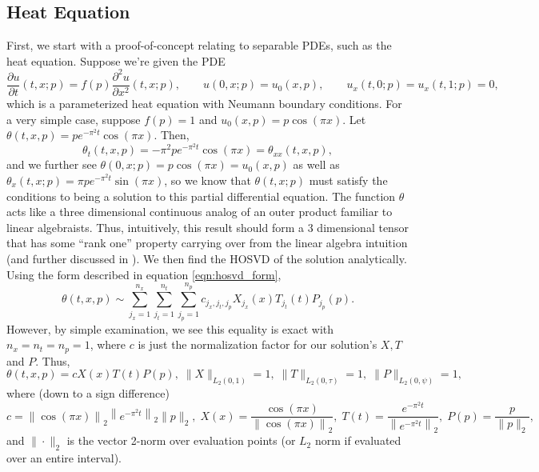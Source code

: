 \documentclass[12pt]{article}
\begin{document}
    \subsection{Heat Equation}
    First, we start with a proof-of-concept relating to separable PDEs, such as the heat equation. Suppose we're given the PDE
        \begin{equation}\label{eqn:pde}
            \frac{\partial u}{\partial t}(t,x;p) = f(p)\frac{\partial^2 u}{\partial x^2}(t,x;p),\qquad u(0,x;p) = u_0(x,p),\qquad u_x(t,0;p) = u_x(t,1;p) = 0,
        \end{equation}
    which is a parameterized heat equation with Neumann boundary conditions. For a very simple case, suppose $f(p) = 1$ and $u_0(x,p) = p\cos(\pi x)$. Let $\theta(t,x,p) = pe^{-\pi^2 t}\cos(\pi x)$. Then,
        \[\theta_t(t,x,p) = -\pi^2pe^{-\pi^2t}\cos(\pi x) =\theta_{xx}(t,x,p),\]
    and we further see $\theta(0,x;p) = p\cos(\pi x) = u_0(x,p)$ as well as $\theta_x(t,x;p) = \pi pe^{-\pi^2 t}\sin(\pi x)$, so we know that $\theta(t,x;p)$ must satisfy the conditions to being a solution to this partial differential equation. The function $\theta$ acts like a three dimensional continuous analog of an outer product familiar to linear algebraists. Thus, intuitively, this result should form a 3 dimensional tensor that has some ``rank one'' property carrying over from the linear algebra intuition (and further discussed in \cite{hosvd,kolda_bader}). We then find the HOSVD of the solution analytically. Using the form described in equation \ref{eqn:hosvd_form},
        \[\theta(t,x,p)\sim\sum_{j_x=1}^{n_x}\sum_{j_t=1}^{n_t}\sum_{j_p=1}^{n_p}c_{j_x,j_t,j_p}X_{j_x}(x)T_{j_t}(t)P_{j_p}(p).\]
    However, by simple examination, we see this equality is exact with $n_x=n_t=n_p=1$, where $c$ is just the normalization factor for our solution's $X,T$ and $P$. Thus,
    \begin{equation}\label{eqn:heat_hosvd}
        \theta(t,x,p) = c X(x)T(t)P(p),\; \|X\|_{L_2(0,1)} = 1,\; \| T\|_{L_2(0,\tau)} = 1,\;\|P\|_{L_2(0,\psi)} = 1,
    \end{equation}
    where (down to a sign difference)
        \[c = \left\|\cos(\pi x)\right\|_2\left\|e^{-\pi^2 t}\right\|_2\|p\|_2,\;X(x) = \frac{\cos(\pi x)}{\left\|\cos(\pi x)\right\|_2},\;T(t) = \frac{e^{-\pi^2 t}}{\left\|e^{-\pi^2 t}\right\|_2},\;P(p) = \frac{p}{\|p\|_2},\]
    and $\|\cdot\|_2$ is the vector 2-norm over evaluation points (or $L_2$ norm if evaluated over an entire interval).
\end{document}
